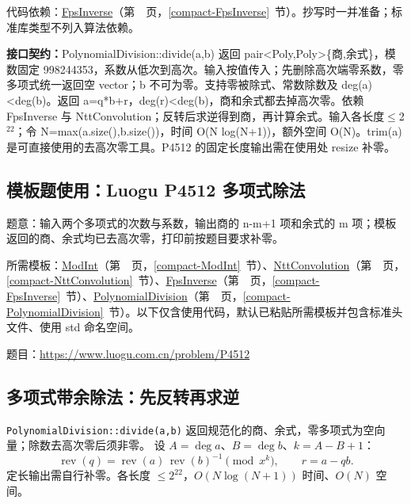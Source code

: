 代码依赖：\hyperref[compact-FpsInverse]{FpsInverse}（第~\pageref{compact-FpsInverse}~页，\ref{compact-FpsInverse}~节）。抄写时一并准备；标准库类型不列入算法依赖。

{\sloppy{}\noindent\textbf{接口契约：}PolynomialDivision::divide(a,b) 返回 pair<Poly,Poly>\{商,余式\}，模数固定 998244353，系数从低次到高次。输入按值传入；先删除高次端零系数，零多项式统一返回空 vector；b 不可为零。支持零被除式、常数除数及 deg(a)<deg(b)。返回 a=q*b+r，deg(r)<deg(b)，商和余式都去掉高次零。依赖 FpsInverse 与 NttConvolution；反转后求逆得到商，再计算余式。输入各长度$\le$2$^{22}$；令 N=max(a.size(),b.size())，时间 O(N log(N+1))，额外空间 O(N)。trim(a) 是可直接使用的去高次零工具。P4512 的固定长度输出需在使用处 resize 补零。\par}



\Needspace{469pt}

\subsection*{模板题使用：Luogu P4512 多项式除法}

\label{usage-example-116}

题意：输入两个多项式的次数与系数，输出商的 n-m+1 项和余式的 m 项；模板返回的商、余式均已去高次零，打印前按题目要求补零。

所需模板：\hyperref[compact-ModInt]{ModInt}（第~\pageref{compact-ModInt}~页，\ref{compact-ModInt}~节）、\hyperref[compact-NttConvolution]{NttConvolution}（第~\pageref{compact-NttConvolution}~页，\ref{compact-NttConvolution}~节）、\hyperref[compact-FpsInverse]{FpsInverse}（第~\pageref{compact-FpsInverse}~页，\ref{compact-FpsInverse}~节）、\hyperref[compact-PolynomialDivision]{PolynomialDivision}（第~\pageref{compact-PolynomialDivision}~页，\ref{compact-PolynomialDivision}~节）。以下仅含使用代码，默认已粘贴所需模板并包含标准头文件、使用 std 命名空间。

题目：\url{https://www.luogu.com.cn/problem/P4512}



\subsection{多项式带余除法：先反转再求逆}\label{knowledge-poly-division}
\texttt{PolynomialDivision::divide(a,b)} 返回规范化的商、余式，零多项式为空向量；除数去高次零后须非零。
设 $A=\deg a$、$B=\deg b$、$k=A-B+1$：
\[
 \operatorname{rev}(q)=\operatorname{rev}(a)\,
 \operatorname{rev}(b)^{-1}\pmod{x^k},\qquad r=a-qb.
\]
定长输出需自行补零。各长度 $\le2^{22}$，$O(N\log(N+1))$ 时间、$O(N)$ 空间。



